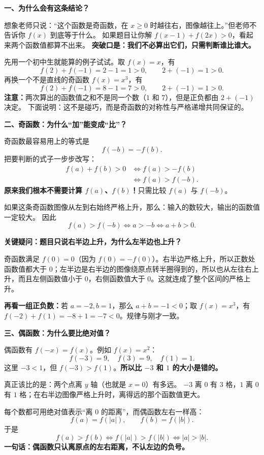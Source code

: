 \clearpage
\begin{explanationbox}
\textbf{\textcolor{CExplanation}{一、为什么会有这条结论？}}



想象老师只说：“这个函数是奇函数，在 $x\geqslant0$ 时越往右，图像越往上。”但老师不告诉你 $f(x)$ 到底等于什么。
如果题目让你解 $f(x-1)+f(2x)>0$，看起来两个函数值都算不出来。
\textbf{突破口是：我们不必算出它们，只需判断谁比谁大。}

先用一个初中生就能算的例子试试。取 $f(x)=x$，有
\[
 f(2)+f(-1)=2-1=1>0,\qquad 2+(-1)=1>0.
\]
再换一个不是直线的奇函数 $f(x)=x^3$，有
\[
 f(2)+f(-1)=8-1=7>0,\qquad 2+(-1)=1>0.
\]
\textbf{注意：}两次算出的函数值之和不是同一个数（$1$ 和 $7$），但是正负都由 $2+(-1)$ 决定。
下面说明：这不是碰巧，而是奇函数的对称性与严格递增共同保证的。

\medskip

\end{explanationbox}
\clearpage
\begin{explanationbox}
\textbf{\textcolor{CExplanation}{二、奇函数：为什么“加”能变成“比”？}}



奇函数最容易用上的等式是
\[
 f(-b)=-f(b).
\]
把要判断的式子一步步改写：
\[
\begin{aligned}
 f(a)+f(b)>0
 &\iff f(a)>-f(b)\\
 &\iff f(a)>f(-b).
\end{aligned}
\]
\textbf{原来我们根本不需要计算 $f(a)$、$f(b)$！}只需比较 $f(a)$ 与 $f(-b)$。

如果这条奇函数图像从左到右始终严格上升，那么：输入的数较大，输出的函数值一定较大。
因此
\[
 f(a)>f(-b)\iff a>-b\iff a+b>0.
\]

\textbf{关键疑问：题目只说右半边上升，为什么左半边也上升？}

奇函数满足 $f(0)=0$（因为 $f(0)=-f(0)$）。右半边严格上升，所以正数处函数值都大于 $0$；左半边是右半边的图像绕原点转半圈得到的，所以也从左往右上升，而且左侧函数值小于 $0$，右侧函数值大于 $0$。这就连成了整个区间的严格上升。

\textbf{再看一组正负数：}若 $a=-2,b=1$，那么 $a+b=-1<0$；取 $f(x)=x^3$，有 $f(-2)+f(1)=-8+1=-7<0$。规律与刚才一致。

\medskip

\end{explanationbox}
\clearpage
\begin{explanationbox}
\textbf{\textcolor{CExplanation}{三、偶函数：为什么要比绝对值？}}



偶函数有 $f(-x)=f(x)$。例如 $f(x)=x^2$：
\[
 f(-3)=9,\quad f(3)=9,\quad f(1)=1.
\]
这里 $-3<1$，但 $f(-3)>f(1)$。\textbf{所以比 $-3$ 和 $1$ 的大小是错的。}

真正该比的是：两个点离 $y$ 轴（也就是 $x=0$）有多远。
$-3$ 离 $0$ 有 $3$ 格，$1$ 离 $0$ 有 $1$ 格；在右半边图像严格上升时，离得远的那个函数值更大。

每个数都可用绝对值表示“离 $0$ 的距离”，而偶函数左右一样高：
\[
 f(a)=f(|a|),\qquad f(b)=f(|b|).
\]
于是
\[
 f(a)>f(b)\iff f(|a|)>f(|b|)\iff |a|>|b|.
\]
\textbf{一句话：偶函数只认离原点的左右距离，不认左边的负号。}

\medskip

\end{explanationbox}
